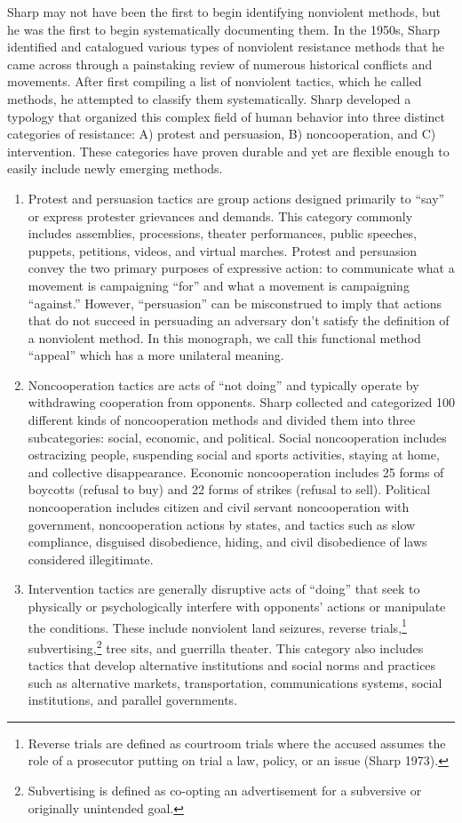 \documentclass[twoside,a4paper,12pt,fleqn,openany]{extbook}
\begin{document}
Sharp may not have been the first to begin identifying nonviolent methods, but he was the first to begin systematically documenting them. In the 1950s, Sharp identified and catalogued various types of nonviolent resistance methods that he came across through a painstaking review of numerous historical conflicts and movements. After first compiling a list of nonviolent tactics, which he called methods, he attempted to classify them systematically. Sharp developed a typology that organized this complex field of human behavior into three distinct categories of resistance: A) protest and persuasion, B) noncooperation, and C) intervention. These categories have proven durable and yet are flexible enough to easily include newly emerging methods.

\begin{enumerate}
\item Protest and persuasion tactics are group actions designed primarily to “say” or express protester grievances and demands. This category commonly includes assemblies, processions, theater performances, public speeches, puppets, petitions, videos, and virtual marches. Protest and persuasion convey the two primary purposes of expressive action: to communicate what a movement is campaigning “for” and what a movement is campaigning “against.” However, “persuasion” can be misconstrued to imply that actions that do not succeed in persuading an adversary don’t satisfy the definition of a nonviolent method. In this monograph, we call this functional method “appeal” which has a more unilateral meaning.
\item Noncooperation tactics are acts of “not doing” and typically operate by withdrawing cooperation from opponents. Sharp collected and categorized 100 different kinds of noncooperation methods and divided them into three subcategories: social, economic, and political. Social noncooperation includes ostracizing people, suspending social and sports activities, staying at home, and collective disappearance. Economic noncooperation includes 25 forms of boycotts (refusal to buy) and 22 forms of strikes (refusal to sell). Political noncooperation includes citizen and civil servant noncooperation with government, noncooperation actions by states, and tactics such as slow compliance, disguised disobedience, hiding, and civil disobedience of laws considered illegitimate.
\item Intervention tactics are generally disruptive acts of “doing” that seek to physically or psychologically interfere with opponents’ actions or manipulate the conditions. These include nonviolent land seizures, reverse trials,\footnote{Reverse trials are defined as courtroom trials where the accused assumes the role of a prosecutor putting on trial a law, policy, or an issue (Sharp 1973).} subvertising,\footnote{Subvertising is defined as co-opting an advertisement for a subversive or originally unintended goal.} tree sits, and guerrilla theater. This category also includes tactics that develop alternative institutions and social norms and practices such as alternative markets, transportation, communications systems, social institutions, and parallel governments.
\end{enumerate}
\end{document}
